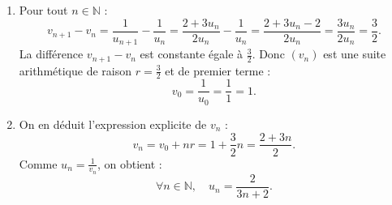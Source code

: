 \documentclass[11pt,a4paper]{article}
\newcommand{\N}{\mathbb{N}}
\begin{document}
\begin{correctionbox}
\begin{enumerate}
    \item Pour tout $n \in \N$ :
    \[
    v_{n+1} - v_n = \frac{1}{u_{n+1}} - \frac{1}{u_n} = \frac{2 + 3u_n}{2u_n} - \frac{1}{u_n} = \frac{2 + 3u_n - 2}{2u_n} = \frac{3u_n}{2u_n} = \frac{3}{2}.
    \]
    La différence $v_{n+1} - v_n$ est constante égale à $\frac{3}{2}$. Donc $(v_n)$ est une suite arithmétique de raison $r = \frac{3}{2}$ et de premier terme :
    \[
    v_0 = \frac{1}{u_0} = \frac{1}{1} = 1.
    \]
    \item On en déduit l'expression explicite de $v_n$ :
    \[
    v_n = v_0 + n r = 1 + \frac{3}{2}n = \frac{2 + 3n}{2}.
    \]
    Comme $u_n = \frac{1}{v_n}$, on obtient :
    \[
    \forall n \in \N, \quad u_n = \frac{2}{3n + 2}.
    \]
\end{enumerate}
\end{correctionbox}

\end{document}
